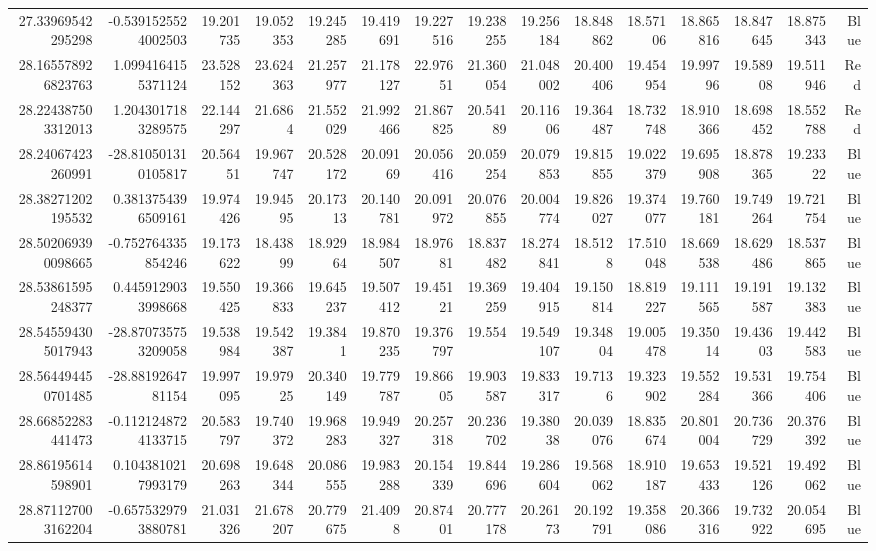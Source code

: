 \begin{center}
\begin{longtable}{rrrrrrrrrrrrrrr}
27.33969542295298 & -0.5391525524002503 & 19.201735 & 19.052353 & 19.245285 & 19.419691 & 19.227516 & 19.238255 & 19.256184 & 18.848862 & 18.57106 & 18.865816 & 18.847645 & 18.875343 & Blue \\
28.165578926823763 & 1.0994164155371124 & 23.528152 & 23.624363 & 21.257977 & 21.178127 & 22.97651 & 21.360054 & 21.048002 & 20.400406 & 19.454954 & 19.99796 & 19.58908 & 19.511946 & Red \\
28.224387503312013 & 1.2043017183289575 & 22.144297 & 21.6864 & 21.552029 & 21.992466 & 21.867825 & 20.54189 & 20.11606 & 19.364487 & 18.732748 & 18.910366 & 18.698452 & 18.552788 & Red \\
28.24067423260991 & -28.810501310105817 & 20.56451 & 19.967747 & 20.528172 & 20.09169 & 20.056416 & 20.059254 & 20.079853 & 19.815855 & 19.022379 & 19.695908 & 18.878365 & 19.23322 & Blue \\
28.38271202195532 & 0.3813754396509161 & 19.974426 & 19.94595 & 20.17313 & 20.140781 & 20.091972 & 20.076855 & 20.004774 & 19.826027 & 19.374077 & 19.760181 & 19.749264 & 19.721754 & Blue \\
28.502069390098665 & -0.752764335854246 & 19.173622 & 18.43899 & 18.92964 & 18.984507 & 18.97681 & 18.837482 & 18.274841 & 18.5128 & 17.510048 & 18.669538 & 18.629486 & 18.537865 & Blue \\
28.53861595248377 & 0.4459129033998668 & 19.550425 & 19.366833 & 19.645237 & 19.507412 & 19.45121 & 19.369259 & 19.404915 & 19.150814 & 18.819227 & 19.111565 & 19.191587 & 19.132383 & Blue \\
28.545594305017943 & -28.870735753209058 & 19.538984 & 19.542387 & 19.3841 & 19.870235 & 19.376797 & 19.554 & 19.549107 & 19.34804 & 19.005478 & 19.35014 & 19.43603 & 19.442583 & Blue \\
28.564494450701485 & -28.8819264781154 & 19.997095 & 19.97925 & 20.340149 & 19.779787 & 19.86605 & 19.903587 & 19.833317 & 19.7136 & 19.323902 & 19.552284 & 19.531366 & 19.754406 & Blue \\
28.66852283441473 & -0.1121248724133715 & 20.583797 & 19.740372 & 19.968283 & 19.949327 & 20.257318 & 20.236702 & 19.38038 & 20.039076 & 18.835674 & 20.801004 & 20.736729 & 20.376392 & Blue \\
28.86195614598901 & 0.1043810217993179 & 20.698263 & 19.648344 & 20.086555 & 19.983288 & 20.154339 & 19.844696 & 19.286604 & 19.568062 & 18.910187 & 19.653433 & 19.521126 & 19.492062 & Blue \\
28.871127003162204 & -0.6575329793880781 & 21.031326 & 21.678207 & 20.779675 & 21.4098 & 20.87401 & 20.777178 & 20.26173 & 20.192791 & 19.358086 & 20.366316 & 19.732922 & 20.054695 & Blue \\

\end{longtable}
\end{center}
